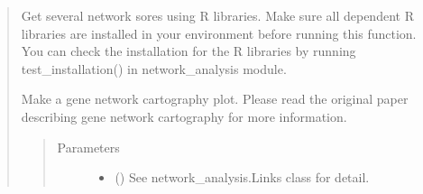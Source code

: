 \documentclass[letterpaper,10pt,english]{sphinxmanual}
\begin{document}
\begin{quote}
\begin{fulllineitems}
\begin{fulllineitems}
\begin{quote}
\begin{description}
\end{description}\end{quote}

\end{fulllineitems}


\begin{fulllineitems}
\label{\detokenize{modules/celloracle.network_analysis:celloracle.network_analysis.Links.get_score}}
Get several network sores using R libraries.
Make sure all dependent R libraries are installed in your environment before running this function.
You can check the installation for the R libraries by running test\_installation() in network\_analysis module.

\end{fulllineitems}


\begin{fulllineitems}
\label{\detokenize{modules/celloracle.network_analysis:celloracle.network_analysis.Links.plot_cartography_scatter_per_cluster}}
Make a gene network cartography plot.
Please read the original paper describing gene network cartography for more information.
\begin{quote}\begin{description}
\item[{Parameters}] \leavevmode\begin{itemize}
\item {} 
 ({\hyperref[\detokenize{modules/celloracle:celloracle.Links}]{}}) \textendash{} See network\_analysis.Links class for detail.


\end{itemize}
\end{description}
\end{quote}
\end{fulllineitems}
\end{fulllineitems}
\end{quote}
\end{document}

